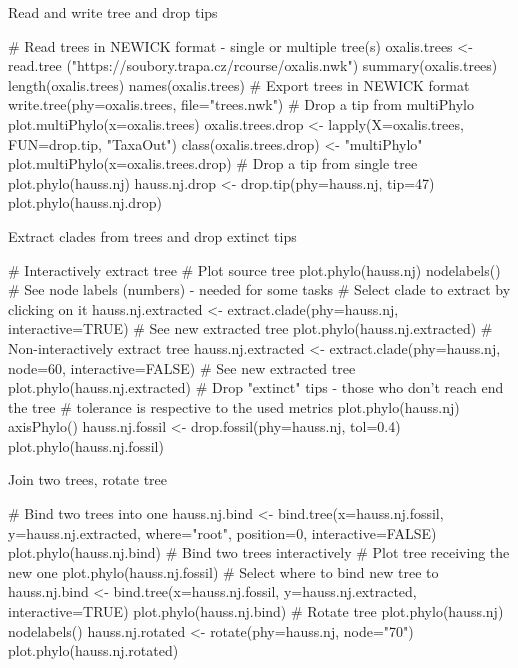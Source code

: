 \documentclass[compress, ucs, xelatex, 11pt, xcolor=svgnames,
  hyperref={
    bookmarks=true,
    unicode=true,
    colorlinks=true,
    pdftitle={Molecular data in R},
    plainpages=false,
    pdfauthor={Vojtech Zeisek},
    pdfsubject={Course about phylogeny and evolution in R},
    pdfcreator={XeLaTeX},
    pdfkeywords={R, evolution, phylogeny, molecular data},
    linkcolor=Tomato,
    anchorcolor=SaddleBrown,
    citecolor=Goldenrod,
    filecolor=DarkMagenta,
    menucolor=Sienna,
    urlcolor=DarkTurquoise,
    pdftex},
  url={hyphens, lowtilde} %
  ]{beamer}
\begin{document}
\begin{frame}[fragile]{Read and write tree and drop tips}
  \begin{spluscode}
    # Read trees in NEWICK format - single or multiple tree(s)
    oxalis.trees <- read.tree
      ("https://soubory.trapa.cz/rcourse/oxalis.nwk")
    summary(oxalis.trees)
    length(oxalis.trees)
    names(oxalis.trees)
    # Export trees in NEWICK format
    write.tree(phy=oxalis.trees, file="trees.nwk")
    # Drop a tip from multiPhylo
    plot.multiPhylo(x=oxalis.trees)
    oxalis.trees.drop <- lapply(X=oxalis.trees, FUN=drop.tip, "TaxaOut")
    class(oxalis.trees.drop) <- "multiPhylo"
    plot.multiPhylo(x=oxalis.trees.drop)
    # Drop a tip from single tree
    plot.phylo(hauss.nj)
    hauss.nj.drop <- drop.tip(phy=hauss.nj, tip=47)
    plot.phylo(hauss.nj.drop)
  \end{spluscode}
\end{frame}

\begin{frame}[fragile]{Extract clades from trees and drop extinct tips}
  \begin{spluscode}
    # Interactively extract tree
    # Plot source tree
    plot.phylo(hauss.nj)
    nodelabels() # See node labels (numbers) - needed for some tasks
    # Select clade to extract by clicking on it
    hauss.nj.extracted <- extract.clade(phy=hauss.nj, interactive=TRUE)
    # See new extracted tree
    plot.phylo(hauss.nj.extracted)
    # Non-interactively extract tree
    hauss.nj.extracted <- extract.clade(phy=hauss.nj, node=60,
      interactive=FALSE)
    # See new extracted tree
    plot.phylo(hauss.nj.extracted)
    # Drop "extinct" tips - those who don't reach end the tree
    # tolerance is respective to the used metrics
    plot.phylo(hauss.nj)
    axisPhylo()
    hauss.nj.fossil <- drop.fossil(phy=hauss.nj, tol=0.4)
    plot.phylo(hauss.nj.fossil)
  \end{spluscode}
\end{frame}

\begin{frame}[fragile]{Join two trees, rotate tree}
  \begin{spluscode}
    # Bind two trees into one
    hauss.nj.bind <- bind.tree(x=hauss.nj.fossil, y=hauss.nj.extracted,
      where="root", position=0, interactive=FALSE)
    plot.phylo(hauss.nj.bind)
    # Bind two trees interactively
    # Plot tree receiving the new one
    plot.phylo(hauss.nj.fossil)
    # Select where to bind new tree to
    hauss.nj.bind <- bind.tree(x=hauss.nj.fossil, y=hauss.nj.extracted,
      interactive=TRUE)
    plot.phylo(hauss.nj.bind)
    # Rotate tree
    plot.phylo(hauss.nj)
    nodelabels()
    hauss.nj.rotated <- rotate(phy=hauss.nj, node="70")
    plot.phylo(hauss.nj.rotated)
  \end{spluscode}
\end{frame}
\end{document}
